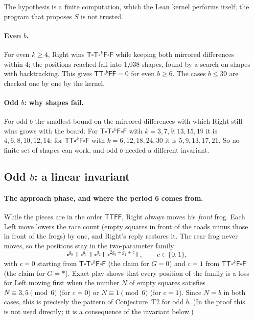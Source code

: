 \documentclass[11pt,a4paper]{article}
\newcommand{\Tt}{\mathsf{T}}
\newcommand{\Ff}{\mathsf{F}}
\newcommand{\E}{\square}
\theoremstyle{plain}
\theoremstyle{remark}
\begin{document}
The hypothesis is a finite computation, which the Lean kernel performs itself; the program that
proposes $S$ is not trusted.

\paragraph{Even $b$.} For even $k\ge4$, Right wins $\Tt\E\Tt\E^k\Ff\E\Ff$ while keeping both
mirrored differences within $4$; the positions reached fall into 1,038 shapes, found by a search
on shapes with backtracking. This gives $\Tt\Tt\E^b\Ff\Ff=0$ for even $b\ge6$. The cases $b\le30$
are checked one by one by the kernel.

\paragraph{Odd $b$: why shapes fail.} For odd $b$ the smallest bound on the mirrored differences
with which Right still wins grows with the board. For $\Tt\E\Tt\E^k\Ff\E\Ff$ with
$k=3,7,9,13,15,19$ it is $4,6,8,10,12,14$; for $\Tt\Tt\E^k\Ff\E\Ff$ with $k=6,12,18,24,30$ it is
$5,9,13,17,21$. So no finite set of shapes can work, and odd $b$ needed a different invariant.

\subsection{Odd \texorpdfstring{$b$}{b}: a linear invariant}

\paragraph{The approach phase, and where the period 6 comes from.} While the pieces are in the
order $\Tt\Tt\Ff\Ff$, Right always moves his \emph{front} frog. Each Left move lowers the race
count (empty squares in front of the toads minus those in front of the frogs) by one, and
Right's reply restores it. The rear frog never moves, so the positions stay in the
two-parameter family
\[
\E^{g_0}\,\Tt\,\E^{g_1}\,\Tt\,\E^{g_2}\,\Ff\,\E^{2g_0+g_1+c}\,\Ff,
\qquad c\in\{0,1\},
\]
with $c=0$ starting from $\Tt\E\Tt\E^{k}\Ff\E\Ff$ (the claim for $G=0$) and $c=1$ from
$\Tt\Tt\E^{k}\Ff\E\Ff$ (the claim for $G=\ast$). Exact play shows that every position of the family is a loss for
Left moving first when the number $N$ of empty squares satisfies $N\equiv 3,5\pmod 6$ (for
$c=0$) or $N\equiv1\pmod6$ (for $c=1$). Since $N=b$ in both cases, this is precisely the pattern
of Conjecture~T2 for odd $b$. (In the proof this is not used directly; it is a consequence of the
invariant below.)
\end{document}
